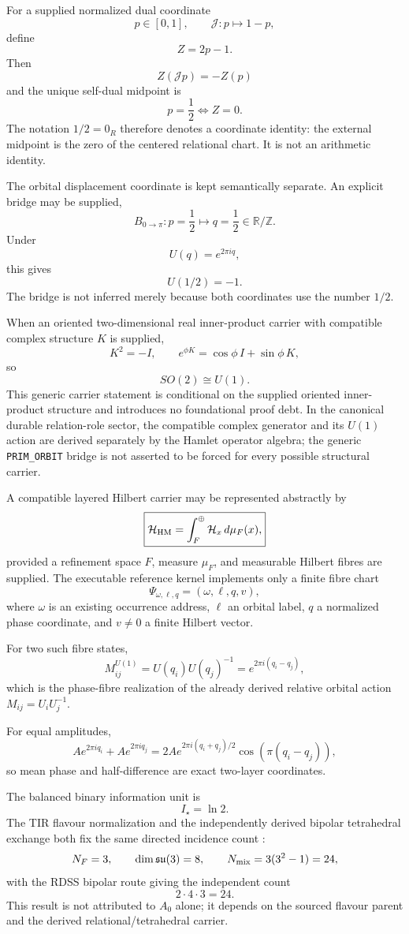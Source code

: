 \documentclass[11pt]{article}
\begin{document}
For a supplied normalized dual coordinate
\[
p\in[0,1],
\qquad
\mathcal J:p\mapsto1-p,
\]
define
\[
\boxed{
Z=2p-1.
}
\]
Then
\[
Z(\mathcal Jp)=-Z(p)
\]
and the unique self-dual midpoint is
\[
\boxed{
p=\frac12
\iff
Z=0.
}
\]
The notation \(1/2=0_R\) therefore denotes a coordinate identity: the external
midpoint is the zero of the centered relational chart. It is not an arithmetic
identity.

The orbital displacement coordinate is kept semantically separate. An
explicit bridge may be supplied,
\[
\boxed{
B_{0\to\pi}:
p=\frac12
\longmapsto
q=\frac12
\in\mathbb R/\mathbb Z.
}
\]
Under
\[
U(q)=e^{2\pi iq},
\]
this gives
\[
\boxed{
U(1/2)=-1.
}
\]
The bridge is not inferred merely because both coordinates use the number
\(1/2\).

When an oriented two-dimensional real inner-product carrier with compatible
complex structure \(K\) is supplied,
\[
K^2=-I,
\qquad
e^{\phi K}
=
\cos\phi\,I+\sin\phi\,K,
\]
so
\[
SO(2)\cong U(1).
\]
This generic carrier statement is conditional on the supplied oriented
inner-product structure and introduces no foundational proof debt. In the
canonical durable relation-role sector, the compatible complex generator and
its \(U(1)\) action are derived separately by the Hamlet operator algebra;
the generic \texttt{PRIM\_ORBIT} bridge is not asserted to be forced for every
possible structural carrier.

A compatible layered Hilbert carrier may be represented abstractly by
\[
\boxed{
\mathcal H_{\rm HM}
=
\int_F^\oplus
\mathcal H_x\,d\mu_F(x),
}
\]
provided a refinement space \(F\), measure \(\mu_F\), and measurable Hilbert
fibres are supplied. The executable reference kernel implements only a finite
fibre chart
\[
\Psi_{\omega,\ell,q}
=
(\omega,\ell,q,v),
\]
where \(\omega\) is an existing occurrence address, \(\ell\) an orbital label,
\(q\) a normalized phase coordinate, and \(v\neq0\) a finite Hilbert vector.

For two such fibre states,
\[
\boxed{
M_{ij}^{U(1)}
=
U(q_i)U(q_j)^{-1}
=
e^{2\pi i(q_i-q_j)},
}
\]
which is the phase-fibre realization of the already derived relative orbital
action \(M_{ij}=U_iU_j^{-1}\).

For equal amplitudes,
\[
A e^{2\pi iq_i}+A e^{2\pi iq_j}
=
2A
e^{2\pi i(q_i+q_j)/2}
\cos\!\left(\pi(q_i-q_j)\right),
\]
so mean phase and half-difference are exact two-layer coordinates.

The balanced binary information unit is
\[
\boxed{
I_\star=\ln2.
}
\]
The TIR flavour normalization and the independently derived bipolar
tetrahedral exchange both fix the same directed incidence count
\cite{LipaTIR2026}:
\[
N_F=3,
\qquad
\dim\mathfrak{su}(3)=8,
\qquad
N_{\rm mix}=3(3^2-1)=24,
\]
with the RDSS bipolar route giving the independent count
\[
2\cdot4\cdot3=24.
\]
This result is not attributed to \(A_0\) alone; it depends on the sourced
flavour parent and the derived relational/tetrahedral carrier.
\end{document}
